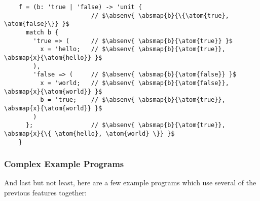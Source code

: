 \documentclass[12pt,twoside]{report}
\begin{document}
\begin{listing}[H]
  \begin{verbatim}
    f = (b: 'true | 'false) -> 'unit {
                        // $\absenv{ \absmap{b}{\{\atom{true}, \atom{false}\}} }$
      match b {
        'true => (      // $\absenv{ \absmap{b}{\atom{true}} }$
          x = 'hello;   // $\absenv{ \absmap{b}{\atom{true}}, \absmap{x}{\atom{hello}} }$
        ),
        'false => (     // $\absenv{ \absmap{b}{\atom{false}} }$
          x = 'world;   // $\absenv{ \absmap{b}{\atom{false}}, \absmap{x}{\atom{world}} }$
          b = 'true;    // $\absenv{ \absmap{b}{\atom{true}}, \absmap{x}{\atom{world}} }$ 
        )
      };                // $\absenv{ \absmap{b}{\atom{true}}, \absmap{x}{\{ \atom{hello}, \atom{world} \}} }$
    }
  \end{verbatim}
  \caption{Each branch of the match statement is abstractly interpreted with  narrowed down to a single atom (lines 4 and 7). Both branches modify , but to different values which make their environments different (lines 5 and 8); these different values are unioned together in the final environment to $\{\atom{hello}, \atom{world}\}$. The false branch happens to mutate  back to $\atom{true}$, which means by the end of \textit{both} branches, $b: \atom{true}$, which is reflected in the final environment which maps  to $\atom{true}$ instead of $\{\atom{true}, \atom{false}\}$.}
\end{listing}

\subsubsection{Complex Example Programs}
And last but not least, here are a few example programs which use several of the previous features together:

\cleardoublepage
\end{document}
